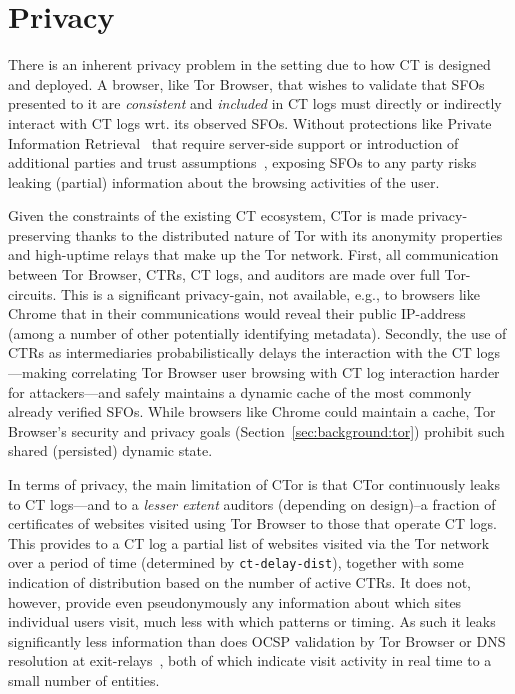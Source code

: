 \section{Privacy} \label{sec:privacy}
There is an inherent privacy problem in the setting due to how CT is designed
and deployed. A browser, like Tor Browser, that wishes to validate that SFOs presented to
it are \emph{consistent} and \emph{included} in CT logs must directly or
indirectly interact with CT logs wrt. its observed SFOs. Without protections
like Private Information Retrieval~\cite{PIR} that require server-side support
or introduction of additional parties and trust
assumptions~\cite{lueks-and-goldberg,kales}, exposing SFOs to any party risks
leaking (partial) information about the browsing activities of the user.

Given the constraints of the existing CT ecosystem, CTor is made
privacy-preserving thanks to the distributed nature of Tor with its anonymity
properties and high-uptime relays that make up the Tor network. First, all
communication between Tor Browser, CTRs, CT logs, and auditors are made over
full Tor-circuits. This is a significant privacy-gain, not available, e.g., to
browsers like Chrome that in their communications would reveal their public
IP-address (among a number of other potentially identifying metadata). Secondly,
the use of CTRs as intermediaries probabilistically delays the interaction with
the CT logs---making correlating Tor Browser user browsing with CT log
interaction harder for attackers---and safely maintains a dynamic cache of the
most commonly already verified SFOs. While browsers like Chrome could maintain a
cache, Tor Browser's security and privacy goals
(Section~\ref{sec:background:tor}) prohibit such shared (persisted) dynamic
state.

In terms of privacy, the main limitation of CTor is that CTor continuously leaks
to CT logs---and to a \emph{lesser extent} auditors (depending on design)--a
fraction of certificates of websites visited using Tor Browser to those that
operate CT logs. This provides to a CT log a partial list of websites visited
via the Tor network over a period of time (determined by
\texttt{ct-delay-dist}), together with some indication of distribution based on
the number of active CTRs. It does not, however, provide even pseudonymously any
information about which sites individual users visit, much less with which
patterns or timing. As such it leaks significantly less information than does
OCSP validation by Tor Browser or DNS resolution at exit-relays~\cite{TorDNS},
both of which indicate visit activity in real time to a small number of
entities.

